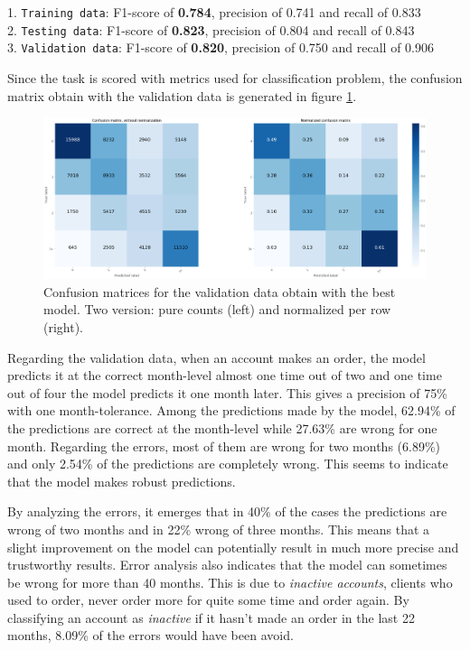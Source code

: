 \noindent\hspace*{0.8cm}  1. \texttt{Training data}:   F1-score of \textbf{0.784}, precision of 0.741 and recall of 0.833 \\
\hspace*{0.8cm}           2. \texttt{Testing data}:    F1-score of \textbf{0.823}, precision of 0.804 and recall of 0.843 \\
\hspace*{0.8cm}           3. \texttt{Validation data}: F1-score of \textbf{0.820}, precision of 0.750 and recall of 0.906

Since the task is scored with metrics used for classification problem, the confusion matrix obtain with the validation data is generated in figure \ref{fig:cf-matrix-validation}.

\begin{figure}[htbp]
    \centering
    \includegraphics[width=15cm]{images/cf-matrix-validation_complete.png}
    \caption[Confusion matrix for validation data]{Confusion matrices for the validation data obtain with the best model. Two version: pure counts (left) and normalized per row (right).}
    \label{fig:cf-matrix-validation}
\end{figure}

Regarding the validation data, when an account makes an order, the model predicts it at the correct month-level almost one time out of two and one time out of four the model predicts it one month later. This gives a precision of 75\% with one month-tolerance. Among the predictions made by the model, 62.94\% of the predictions are correct at the month-level while 27.63\% are wrong for one month. Regarding the errors, most of them are wrong for two months (6.89\%) and only 2.54\% of the predictions are completely wrong. This seems to indicate that the model makes robust predictions.

By analyzing the errors, it emerges that in 40\% of the cases the predictions are wrong of two months and in 22\% wrong of three months. This means that a slight improvement on the model can potentially result in much more precise and trustworthy results. Error analysis also indicates that the model can sometimes be wrong for more than 40 months. This is due to \textit{inactive accounts}, clients who used to order, never order more for quite some time and order again. By classifying an account as \textit{inactive} if it hasn't made an order in the last 22 months, 8.09\% of the errors would have been avoid.

